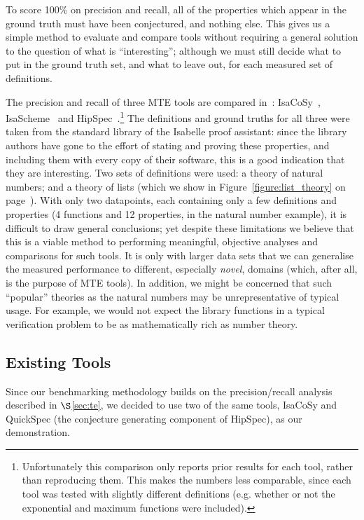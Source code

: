 To score 100\% on precision and recall, all of the properties which appear in
the ground truth must have been conjectured, and nothing else. This gives us a
simple method to evaluate and compare tools without requiring a general solution
to the question of what is ``interesting''; although we must still decide what
to put in the ground truth set, and what to leave out, for each measured set of
definitions.

The precision and recall of three MTE tools are compared
in~\cite{claessen2013automating}:
IsaCoSy~\cite{Johansson.Dixon.Bundy:conjecture-generation},
IsaScheme~\cite{MontanoRivas2011} and
HipSpec~\cite{Claessen_hipspec:automating}.\footnote{Unfortunately this
  comparison only reports prior results for each tool, rather than reproducing
  them. This makes the numbers less comparable, since each tool was tested with
  slightly different definitions (e.g. whether or not the exponential and
  maximum functions were included).} The definitions and ground truths for all
three were taken from the standard library of the Isabelle proof assistant:
since the library authors have gone to the effort of stating and proving these
properties, and including them with every copy of their software, this is a good
indication that they are interesting. Two sets of definitions were used: a
theory of natural numbers; and a theory of lists (which we show in
Figure~\ref{figure:list_theory} on page~\pageref{figure:list_theory}). With only
two datapoints, each containing only a few definitions and properties (4
functions and 12 properties, in the natural number example), it is difficult
to draw general conclusions; yet despite these limitations we believe that this
is a viable method to performing meaningful, objective analyses and comparisons
for such tools. It is only with larger data sets that we can generalise the
measured performance to different, especially \emph{novel}, domains (which,
after all, is the purpose of MTE tools). In addition, we might be concerned that
such ``popular'' theories as the natural numbers may be unrepresentative of
typical usage. For example, we would not expect the library functions in a
typical verification problem to be as mathematically rich as number theory.

\subsection{Existing Tools}
\label{sec:existing-tools}

Since our benchmarking methodology builds on the precision/recall analysis
described in $\S$\ref{sec:te}, we decided to use two of the same tools, IsaCoSy
and QuickSpec (the conjecture generating component of HipSpec), as our
demonstration.

